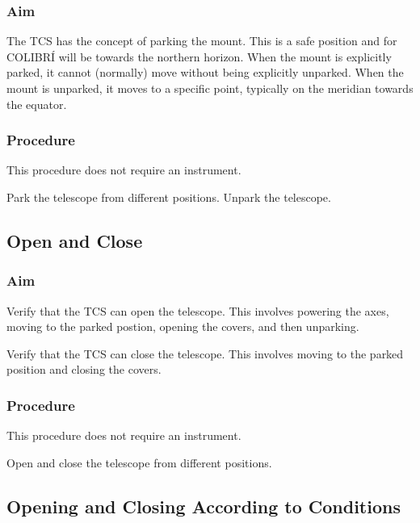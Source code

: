 \documentclass{article}
\begin{document}
\subsubsection{Aim}

The TCS has the concept of parking the mount. This is a safe position and for COLIBRÍ will be towards the northern horizon. When the mount is explicitly parked, it cannot (normally) move without being explicitly unparked. When the mount is unparked, it moves to a specific point, typically on the meridian towards the equator.

\subsubsection{Procedure}

This procedure does not require an instrument.

Park the telescope from different positions. Unpark the telescope.


\subsection{Open and Close}

\subsubsection{Aim}

Verify that the TCS can open the telescope. This involves powering the axes, moving to the parked postion, opening the covers, and then unparking. 

Verify that the TCS can close the telescope. This involves moving to the parked position and closing the covers.

\subsubsection{Procedure}

This procedure does not require an instrument.

Open and close the telescope from different positions.


\subsection{Opening and Closing According to Conditions}
\end{document}
